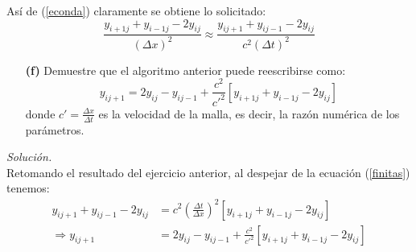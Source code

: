 \documentclass[11pt]{article}
\begin{document}
	Así de (\ref{econda}) claramente se obtiene lo solicitado:
	 \begin{equation}
	 	\frac{y_{i+1j} + y_{i-1 j}- 2y_{ij}}{ (\Delta x)^2} \approx \frac{y_{ij+1} + y_{i j-1}- 2y_{ij}}{c^2 (\Delta t)^2} \label{finitas}
	 \end{equation}
\begin{enumerate}
	\item [\textbf{(f)}] Demuestre que el algoritmo anterior puede reescribirse como:
	\begin{equation}\label{m3}
		y_{ij+1} = 2y_{ij} - y_{ij-1} +\frac{c^2}{c'^2}[y_{i+1j} + y_{i-1j} - 2y_{ij}]
	\end{equation}
	donde $c'= \frac{\Delta x}{\Delta t}$ es la velocidad de la malla, es decir, la razón numérica de los parámetros.
\end{enumerate}
\textit{Solución.}\\	
	Retomando el resultado del ejercicio anterior, al despejar de la ecuación (\ref{finitas}) tenemos:
	\begin{align*}
		y_{i j+1}+ y_{ij-1} -2y_{ij} &= c^2 \left(\frac{\Delta t}{\Delta x}\right)^2 [y_{i+1j} + y_{i-1 j}- 2y_{ij}]	\\
		\Rightarrow y_{i j+1}&= 2y_{ij} -y_{ij-1} + \frac{c^2}{c'^2} [y_{i+1j} + y_{i-1 j}- 2y_{ij}]
	\end{align*}
\end{document}

